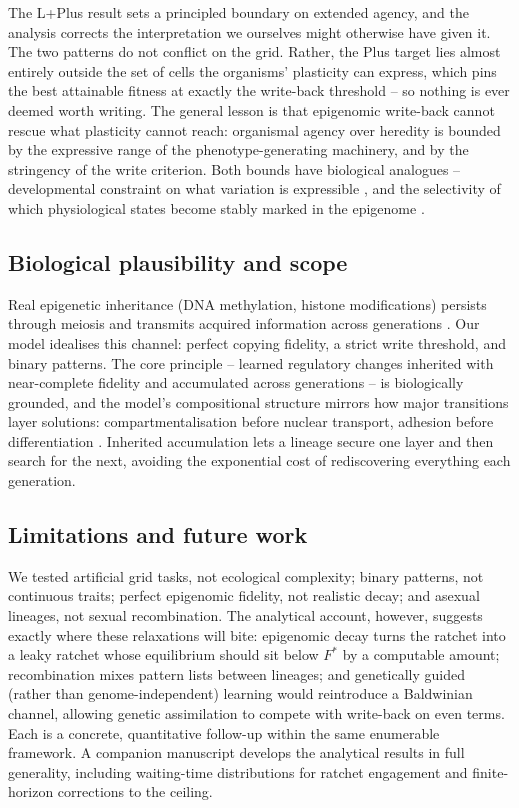 \documentclass[11pt]{article}
\begin{document}
The L+Plus result sets a principled boundary on extended agency, and the
analysis corrects the interpretation we ourselves might otherwise have given
it. The two patterns do not conflict on the grid. Rather, the Plus target
lies almost entirely outside the set of cells the organisms' plasticity can
express, which pins the best attainable fitness at exactly the write-back
threshold -- so nothing is ever deemed worth writing. The general lesson is
that epigenomic write-back cannot rescue what plasticity cannot reach:
organismal agency over heredity is bounded by the expressive range of the
phenotype-generating machinery, and by the stringency of the write
criterion. Both bounds have biological analogues -- developmental constraint
on what variation is expressible \citep{WestEberhard2003}, and the
selectivity of which physiological states become stably marked in the
epigenome \citep{Jablonka2014}.

\subsection{Biological plausibility and scope}

Real epigenetic inheritance (DNA methylation, histone modifications)
persists through meiosis and transmits acquired information across
generations \citep{Pembrey2006,WaterlandJirtle2007}. Our model idealises
this channel: perfect copying fidelity, a strict write threshold, and binary
patterns. The core principle -- learned regulatory changes inherited with
near-complete fidelity and accumulated across generations -- is biologically
grounded, and the model's compositional structure mirrors how major
transitions layer solutions: compartmentalisation before nuclear transport,
adhesion before differentiation \citep{MaynardSmith1995}. Inherited
accumulation lets a lineage secure one layer and then search for the next,
avoiding the exponential cost of rediscovering everything each generation.

\subsection{Limitations and future work}

We tested artificial grid tasks, not ecological complexity; binary patterns,
not continuous traits; perfect epigenomic fidelity, not realistic decay; and
asexual lineages, not sexual recombination. The analytical account, however,
suggests exactly where these relaxations will bite: epigenomic decay turns
the ratchet into a leaky ratchet whose equilibrium should sit below $F^*$ by
a computable amount; recombination mixes pattern lists between lineages; and
genetically guided (rather than genome-independent) learning would
reintroduce a Baldwinian channel, allowing genetic assimilation to compete
with write-back on even terms. Each is a concrete, quantitative follow-up
within the same enumerable framework. A companion manuscript develops the
analytical results in full generality, including waiting-time distributions
for ratchet engagement and finite-horizon corrections to the ceiling.
\end{document}
